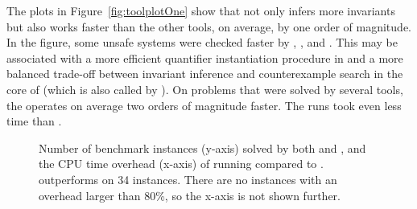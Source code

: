 The plots in Figure~\ref{fig:toolplotOne} show that \ringen{\cvc{}} not only infers more invariants but also works faster than the other tools, on average, by one order of magnitude. In the figure, some unsafe systems were checked faster by \cvcind{}, \vericat{}, and \racer{}. This may be associated with a more efficient quantifier instantiation procedure in \cvcind{} and a more balanced trade-off between invariant inference and counterexample search in the core of \racer{} (which is also called by \vericat{}).
On problems that were solved by several tools, the \ringen{\cvc} operates on average two orders of magnitude faster.
The \ringen{\vampire{}} runs took even less time than \ringen{\cvc}.

\begin{figure}
    \pgfmathsetmacro\NRows{\pgfplotsretval}
        \centering
    \caption{ Number of benchmark instances (y-axis) solved by both \theringenCICI{} and \racer{}, and the CPU time overhead (x-axis) of running \theringenCICI{} compared to \racer{}. \racer{} outperforms \theringenCICI{} on 34 instances. There are no instances with an overhead larger than 80\%, so the x-axis is not shown further.}
    \label{fig:performance}
\end{figure}

